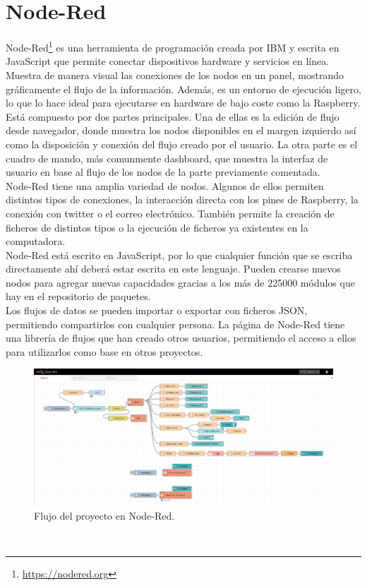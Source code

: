 \section{Node-Red}
\label{sec:nodered}
Node-Red\footnote{\url{https://nodered.org}} es una herramienta de programación creada por IBM y escrita en JavaScript que permite conectar dispositivos hardware y servicios en línea. Muestra de manera visual las conexiones de los nodos en un panel, mostrando gráficamente el flujo de la información. Además, es un entorno de ejecución ligero, lo que lo hace ideal para ejecutarse en hardware de bajo coste como la Raspberry.\\
Está compuesto por dos partes principales. Una de ellas es la edición de flujo desde navegador, donde muestra los nodos disponibles en el margen izquierdo así como la disposición y conexión del flujo creado por el usuario. La otra parte es el cuadro de mando, más comunmente dashboard, que muestra la interfaz de usuario en base al flujo de los nodos de la parte previamente comentada.\\
Node-Red tiene una amplia variedad de nodos. Algunos de ellos permiten distintos tipos de conexiones, la interacción directa con los pines de Raspberry, la conexión con twitter o el correo electrónico. También permite la creación de ficheros de distintos tipos o la ejecución de ficheros ya existentes en la computadora.\\
Node-Red está escrito en JavaScript, por lo que cualquier función que se escriba directamente ahí deberá estar escrita en este lenguaje. Pueden crearse nuevos nodos para agregar nuevas capacidades gracias a los más de 225000 módulos que hay en el repositorio de paquetes.\\
Los flujos de datos se pueden importar o exportar con ficheros JSON, permitiendo compartirlos con cualquier persona. La página de Node-Red tiene una librería de flujos que han creado otros usuarios, permitiendo el acceso a ellos para utilizarlos como base en otros proyectos.\\
\begin{figure} [h!]
  \begin{center}
    \includegraphics[width=15cm]{figs/flujo}
  \end{center}
  \caption{Flujo del proyecto en Node-Red.}
  \label{fig:flow}
\end{figure}\\

